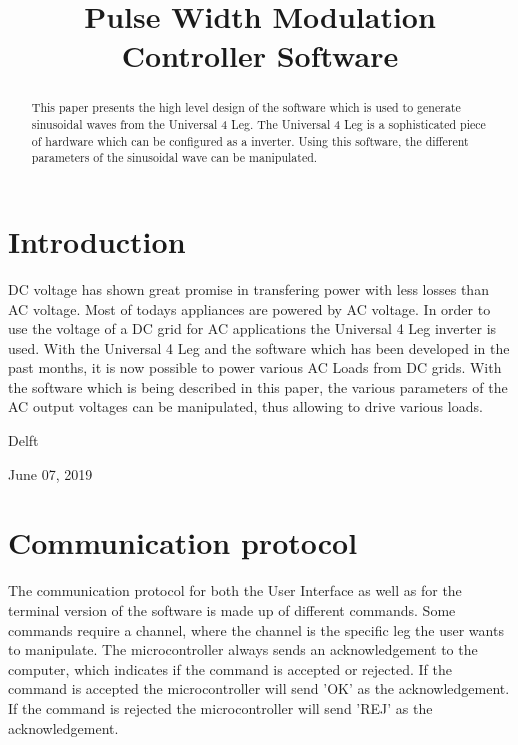 \documentclass[conference]{IEEEtran}
\begin{document}
\title{Pulse Width Modulation Controller Software}


\author{
\and
{}
\and
{}
}


\maketitle


\begin{abstract}
This paper presents the high level design of the software which is used to generate sinusoidal waves from the Universal 4 Leg. The Universal 4 Leg is a sophisticated piece of hardware which can be configured as a inverter. Using this software, the different parameters of the sinusoidal wave can be manipulated.
\end{abstract}


\IEEEpeerreviewmaketitle



\section{Introduction}
DC voltage has shown great promise in transfering power with less losses than AC voltage. Most of todays appliances are powered by AC voltage. In order to use the voltage of a DC grid for AC applications the Universal 4 Leg inverter is used. With the Universal 4 Leg and the software which has been developed in the past months, it is now possible to power various AC Loads from DC grids. With the software which is being described in this paper, the various parameters of the AC output voltages can be manipulated, thus allowing to drive various loads. 

\hfill Delft
 
\hfill June 07, 2019

\section{Communication protocol}
The communication protocol for both the User Interface as well as for the terminal version of the software is made up of different commands. Some commands require a channel, where the channel is the specific leg the user wants to manipulate. The microcontroller always sends an acknowledgement to the computer, which indicates if the command is accepted or rejected. If the command is accepted the microcontroller will send 'OK' as the acknowledgement. If the command is rejected the microcontroller will send 'REJ' as the acknowledgement.
\end{document}
